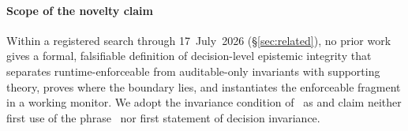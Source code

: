 \paragraph*{Scope of the novelty claim}
Within a registered search through 17~July~2026 (\S\ref{sec:related}),
no prior work gives a formal, falsifiable definition of decision-level
epistemic integrity that separates runtime-enforceable from
auditable-only invariants with supporting theory, proves where the
boundary lies, and instantiates the enforceable fragment in a working
monitor. We adopt the invariance condition of~\cite{qu} as \Ifive{} and
claim neither first use of the phrase~\cite{shen} nor first statement
of decision invariance.
